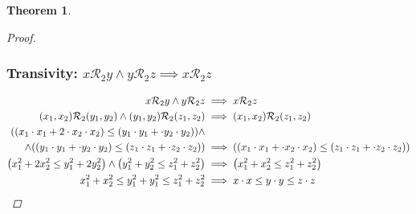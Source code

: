 \documentclass[]{article}
\newcommand{\Rel}{\mathcal{R}}
\newtheorem{theorem}{Theorem}
\begin{document}
\begin{theorem}
\begin{proof}
        \subsubsection{Transivity: $x \Rel_2 y \land y \Rel_2 z \implies x \Rel_2 z$}
        \begin{align*}
            x \Rel_2 y \land y \Rel_2 z 
                &\implies x \Rel_2 z\\
            (x_1,x_2) \Rel_2 (y_1,y_2) \land (y_1,y_2) \Rel_2 (z_1,z_2)
                &\implies (x_1,x_2) \Rel_2 (z_1,z_2)\\
            \qty((x_1 \cdot x_1 + 2 \cdot x_2 \cdot x_2)
                    \leq (y_1 \cdot y_1 + \cdot y_2 \cdot y_2)) 
                \land&\\
                \land \qty((y_1 \cdot y_1 + \cdot y_2 \cdot y_2)
                    \leq (z_1 \cdot z_1 + \cdot z_2 \cdot z_2)) 
                &\implies \qty((x_1 \cdot x_1 + \cdot x_2 \cdot x_2)
                    \leq (z_1 \cdot z_1 + \cdot z_2 \cdot z_2))\\
            \qty(x_1^2 + 2 x_2^2 \leq y_1^2 + 2 y_2^2)
                    \land \qty(y_1^2 + y_2^2 \leq z_1^2 + z_2^2)
                &\implies \qty(x_1^2 + x_2^2 \leq z_1^2 + z_2^2)\\
            x_1^2 + x_2^2 \leq y_1^2 + y_1^2 \leq z_1^2 + z_2^2
                &\implies x \cdot x \leq y \cdot y \leq z \cdot z
        \end{align*}
    \end{proof}
\end{theorem}
\end{document}
